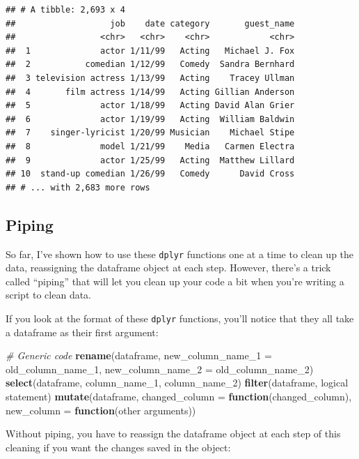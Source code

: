 \documentclass[]{book}
\makeatletter
\newenvironment{Shaded}{\begin{snugshade}}{\end{snugshade}}
\newcommand{\KeywordTok}[1]{\textcolor[rgb]{0.13,0.29,0.53}{\textbf{#1}}}
\newcommand{\DataTypeTok}[1]{\textcolor[rgb]{0.13,0.29,0.53}{#1}}
\newcommand{\DecValTok}[1]{\textcolor[rgb]{0.00,0.00,0.81}{#1}}
\newcommand{\CommentTok}[1]{\textcolor[rgb]{0.56,0.35,0.01}{\textit{#1}}}
\newcommand{\ControlFlowTok}[1]{\textcolor[rgb]{0.13,0.29,0.53}{\textbf{#1}}}
\newcommand{\NormalTok}[1]{#1}
\newenvironment{kframe}{%
\medskip{}
\setlength{\fboxsep}{.8em}
 \def\at@end@of@kframe{}%
 \ifinner\ifhmode%
  \def\at@end@of@kframe{\end{minipage}}%
  \begin{minipage}{\columnwidth}%
 \fi\fi%
 \def\FrameCommand##1{\hskip\@totalleftmargin \hskip-\fboxsep
 \colorbox{shadecolor}{##1}\hskip-\fboxsep
     \hskip-\linewidth \hskip-\@totalleftmargin \hskip\columnwidth}%
 \MakeFramed {\advance\hsize-\width
   \@totalleftmargin\z@ \linewidth\hsize
   \@setminipage}}%
 {\par\unskip\endMakeFramed%
 \at@end@of@kframe}
\renewenvironment{Shaded}{\begin{kframe}}{\end{kframe}}
\theoremstyle{definition}
\theoremstyle{definition}
\theoremstyle{definition}
\theoremstyle{remark}
\makeatother
\begin{document}
\begin{verbatim}
## # A tibble: 2,693 x 4
##                   job    date category       guest_name
##                 <chr>   <chr>    <chr>            <chr>
##  1              actor 1/11/99   Acting   Michael J. Fox
##  2           comedian 1/12/99   Comedy  Sandra Bernhard
##  3 television actress 1/13/99   Acting    Tracey Ullman
##  4       film actress 1/14/99   Acting Gillian Anderson
##  5              actor 1/18/99   Acting David Alan Grier
##  6              actor 1/19/99   Acting  William Baldwin
##  7    singer-lyricist 1/20/99 Musician    Michael Stipe
##  8              model 1/21/99    Media   Carmen Electra
##  9              actor 1/25/99   Acting  Matthew Lillard
## 10  stand-up comedian 1/26/99   Comedy      David Cross
## # ... with 2,683 more rows
\end{verbatim}

\subsection{Piping}\label{piping}

So far, I've shown how to use these \texttt{dplyr} functions one at a
time to clean up the data, reassigning the dataframe object at each
step. However, there's a trick called ``piping'' that will let you clean
up your code a bit when you're writing a script to clean data.

If you look at the format of these \texttt{dplyr} functions, you'll
notice that they all take a dataframe as their first argument:

\begin{Shaded}
\begin{Highlighting}[]
\CommentTok{# Generic code}
\KeywordTok{rename}\NormalTok{(dataframe, }
       \DataTypeTok{new_column_name_1 =}\NormalTok{ old_column_name_}\DecValTok{1}\NormalTok{,}
       \DataTypeTok{new_column_name_2 =}\NormalTok{ old_column_name_}\DecValTok{2}\NormalTok{)}
\KeywordTok{select}\NormalTok{(dataframe, column_name_}\DecValTok{1}\NormalTok{, column_name_}\DecValTok{2}\NormalTok{)}
\KeywordTok{filter}\NormalTok{(dataframe, logical statement)}
\KeywordTok{mutate}\NormalTok{(dataframe,}
       \DataTypeTok{changed_column =} \ControlFlowTok{function}\NormalTok{(changed_column),}
       \DataTypeTok{new_column =} \ControlFlowTok{function}\NormalTok{(other arguments))}
\end{Highlighting}
\end{Shaded}

Without piping, you have to reassign the dataframe object at each step
of this cleaning if you want the changes saved in the object:
\end{document}
